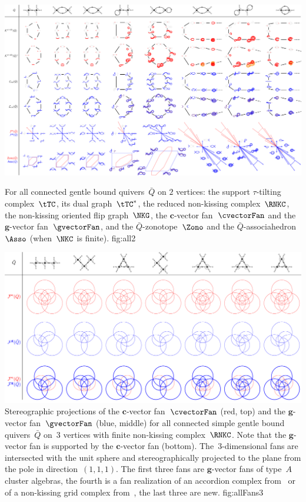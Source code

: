 \documentclass{memo-l}
\theoremstyle{definition}
\renewcommand{\b}[1]{\mathbf{#1}} %
\begin{document}
\captionsetup{width=1.5\textwidth}
{\begin{minipage}{23.2cm}\vspace*{-1cm}\includegraphics[scale=.25]{all2}\end{minipage}}
{
For all connected gentle bound quivers~$\bar Q$ on $2$ vertices: the support $\tau$-tilting complex~$\tTC$, its dual graph~$\tTC^*$, the reduced non-kissing complex~$\RNKC$, the non-kissing oriented flip graph~$\NKG$, the $\b{c}$-vector fan~$\cvectorFan$ and the $\b{g}$-vector fan~$\gvectorFan$, and the $\bar Q$-zonotope~$\Zono$ and the $\bar Q$-associahedron~$\Asso$ (when~$\NKC$ is finite).
}
{fig:all2}
\captionsetup{width=\textwidth}

\captionsetup{width=1.5\textwidth}
{\includegraphics[scale=.27]{allFans3}}
{Stereographic projections of the $\b{c}$-vector fan~$\cvectorFan$ (red, top) and the $\b{g}$-vector fan~$\gvectorFan$ (blue, middle) for all connected simple gentle bound quivers~$\bar Q$ on~$3$ vertices with finite non-kissing complex~$\RNKC$. Note that the $\b{g}$-vector fan is supported by the $\b{c}$-vector fan (bottom). The~$3$-dimensional fans are intersected with the unit sphere and stereographically projected to the plane from the pole in direction~$(1,1,1)$. The first three fans are $\b{g}$-vector fans of type~$A$ cluster algebras, the fourth is a fan realization of an accordion complex from~\cite{MannevillePilaud-accordion} or of a non-kissing grid complex from~\cite{GarverMcConville-grid}, the last three are new.}
{fig:allFans3}
\captionsetup{width=\textwidth}
\end{document}

